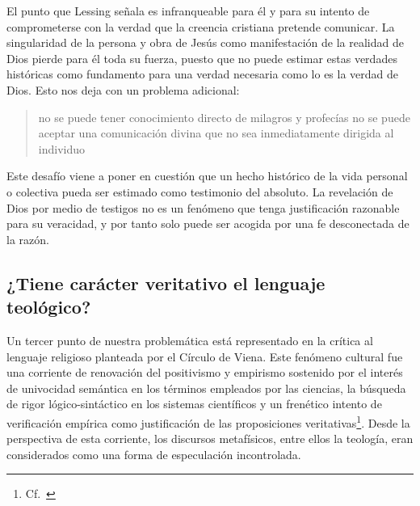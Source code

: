 El punto que Lessing señala es infranqueable para él y para su intento de comprometerse con la verdad que la creencia cristiana pretende comunicar. La singularidad de la persona y obra de Jesús como manifestación de la realidad de Dios pierde para él toda su fuerza, puesto que no puede estimar estas verdades históricas como fundamento para una verdad necesaria como lo es la verdad de Dios. Esto nos deja con un problema adicional: \blockquote[{\cite[294]{prades2015testimonio}}]{no se puede tener conocimiento directo de milagros y profecías \textelp{} no se puede aceptar una comunicación divina que no sea inmediatamente dirigida al individuo}.

Este desafío viene a poner en cuestión que un hecho histórico de la vida personal o colectiva pueda ser estimado como testimonio del absoluto. La revelación de Dios por medio de testigos no es un fenómeno que tenga justificación razonable para su veracidad, y por tanto solo puede ser acogida por una fe desconectada de la razón.

\subsection{¿Tiene carácter veritativo el lenguaje teológico?}

Un tercer punto de nuestra problemática está representado en la crítica al lenguaje religioso planteada por el Círculo de Viena. Este fenómeno cultural fue una corriente de renovación del positivismo y empirismo sostenido por el interés de univocidad semántica en los términos empleados por las ciencias, la búsqueda de rigor lógico-sintáctico en los sistemas científicos y un frenético intento de verificación empírica como justificación de las proposiciones veritativas\footnote{Cf.~\cite[152]{dominguez2009at}}. Desde la perspectiva de esta corriente, los discursos metafísicos, entre ellos la teología, eran considerados como una forma de especulación incontrolada.

